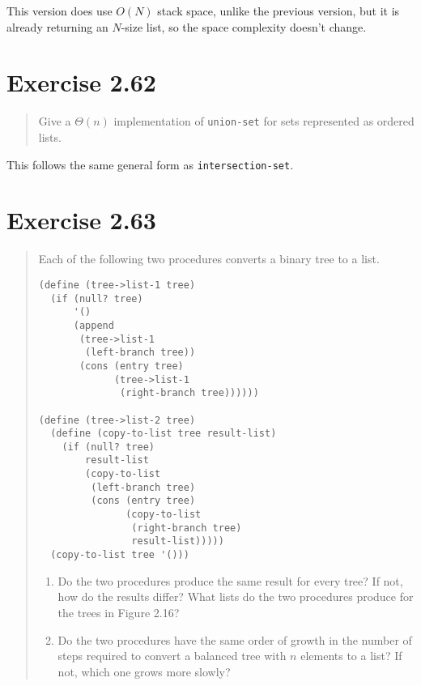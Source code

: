 \documentclass{article}
\begin{document}


This version does use $O(N)$ stack space, unlike the previous version, but it
is already returning an $N$-size list, so the space complexity doesn't change.

\section{Exercise 2.62}
\begin{quote}
    Give a $\Theta(n)$ implementation of \texttt{union-set} for sets
    represented as ordered lists.
\end{quote}

This follows the same general form as \texttt{intersection-set}.


\section{Exercise 2.63}
\begin{quote}
    Each of the following two procedures converts a binary tree to a list.

    \begin{lstlisting}
(define (tree->list-1 tree)
  (if (null? tree)
      '()
      (append
       (tree->list-1
        (left-branch tree))
       (cons (entry tree)
             (tree->list-1
              (right-branch tree))))))

(define (tree->list-2 tree)
  (define (copy-to-list tree result-list)
    (if (null? tree)
        result-list
        (copy-to-list
         (left-branch tree)
         (cons (entry tree)
               (copy-to-list
                (right-branch tree)
                result-list)))))
  (copy-to-list tree '()))
    \end{lstlisting}

    \begin{enumerate}
        \item Do the two procedures produce the same result for every tree? If
            not, how do the results differ? What lists do the two procedures
            produce for the trees in Figure 2.16?
        \item Do the two procedures have the same order of growth in the number
            of steps required to convert a balanced tree with $n$ elements to a
            list? If not, which one grows more slowly?
    \end{enumerate}
\end{quote}
\end{document}
